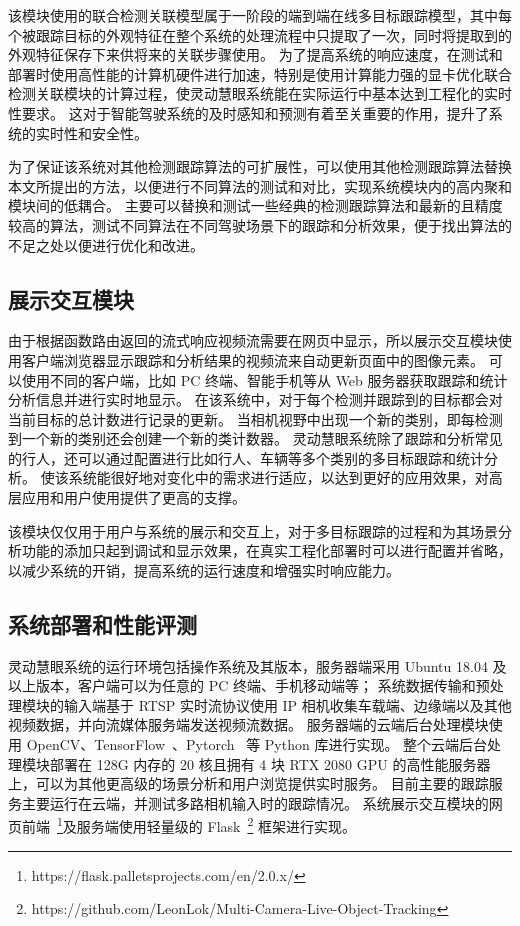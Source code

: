 该模块使用的联合检测关联模型属于一阶段的端到端在线多目标跟踪模型，其中每个被跟踪目标的外观特征在整个系统的处理流程中只提取了一次，同时将提取到的外观特征保存下来供将来的关联步骤使用。
为了提高系统的响应速度，在测试和部署时使用高性能的计算机硬件进行加速，特别是使用计算能力强的显卡优化联合检测关联模块的计算过程，使灵动慧眼系统能在实际运行中基本达到工程化的实时性要求。
这对于智能驾驶系统的及时感知和预测有着至关重要的作用，提升了系统的实时性和安全性。

为了保证该系统对其他检测跟踪算法的可扩展性，可以使用其他检测跟踪算法替换本文所提出的方法，以便进行不同算法的测试和对比，实现系统模块内的高内聚和模块间的低耦合。
主要可以替换和测试一些经典的检测跟踪算法和最新的且精度较高的算法，测试不同算法在不同驾驶场景下的跟踪和分析效果，便于找出算法的不足之处以便进行优化和改进。



\subsection{展示交互模块}
由于根据函数路由返回的流式响应视频流需要在网页中显示，所以展示交互模块使用客户端浏览器显示跟踪和分析结果的视频流来自动更新页面中的图像元素。
可以使用不同的客户端，比如 PC 终端、智能手机等从 Web 服务器获取跟踪和统计分析信息并进行实时地显示。
在该系统中，对于每个检测并跟踪到的目标都会对当前目标的总计数进行记录的更新。
当相机视野中出现一个新的类别，即每检测到一个新的类别还会创建一个新的类计数器。
灵动慧眼系统除了跟踪和分析常见的行人，还可以通过配置进行比如行人、车辆等多个类别的多目标跟踪和统计分析。
使该系统能很好地对变化中的需求进行适应，以达到更好的应用效果，对高层应用和用户使用提供了更高的支撑。

该模块仅仅用于用户与系统的展示和交互上，对于多目标跟踪的过程和为其场景分析功能的添加只起到调试和显示效果，在真实工程化部署时可以进行配置并省略，以减少系统的开销，提高系统的运行速度和增强实时响应能力。


\subsection{系统部署和性能评测}
灵动慧眼系统的运行环境包括操作系统及其版本，服务器端采用 Ubuntu 18.04 及以上版本，客户端可以为任意的 PC 终端、手机移动端等；
系统数据传输和预处理模块的输入端基于 RTSP 实时流协议使用 IP 相机收集车载端、边缘端以及其他视频数据，并向流媒体服务端发送视频流数据。
服务器端的云端后台处理模块使用 OpenCV、TensorFlow~\cite{abadi2016tensorflow}、Pytorch~\cite{paszke2019pytorch} 等 Python 库进行实现。
整个云端后台处理模块部署在 128G 内存的 20 核且拥有 4 块 RTX 2080 GPU 的高性能服务器上，可以为其他更高级的场景分析和用户浏览提供实时服务。
目前主要的跟踪服务主要运行在云端，并测试多路相机输入时的跟踪情况。
系统展示交互模块的网页前端~\footnote{https://flask.palletsprojects.com/en/2.0.x/}及服务端使用轻量级的 Flask~\footnote{https://github.com/LeonLok/Multi-Camera-Live-Object-Tracking} 框架进行实现。


